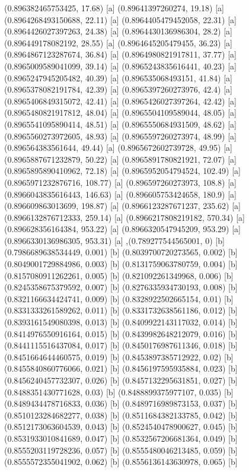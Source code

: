 {{{(0.896382465753425, 17.68) [a] 
(0.89641397260274, 19.18) [a] 
(0.8964268493150688, 22.11) [a] 
(0.8964405479452058, 22.31) [a] 
(0.8964426027397263, 24.38) [a] 
(0.8964430136986304, 28.2) [a] 
(0.896449178082192, 28.55) [a] 
(0.8964645205479455, 36.23) [a] 
(0.8964867123287674, 36.84) [a] 
(0.8964980821917811, 37.77) [a] 
(0.8965009589041099, 39.14) [a] 
(0.8965243835616441, 40.23) [a] 
(0.8965247945205482, 40.39) [a] 
(0.896535068493151, 41.84) [a] 
(0.8965378082191784, 42.39) [a] 
(0.8965397260273976, 42.4) [a] 
(0.8965406849315072, 42.41) [a] 
(0.8965426027397264, 42.42) [a] 
(0.8965480821917812, 48.04) [a] 
(0.8965504109589044, 48.05) [a] 
(0.8965541095890414, 48.51) [a] 
(0.8965550684931509, 48.62) [a] 
(0.8965560273972605, 48.93) [a] 
(0.8965597260273974, 48.99) [a] 
(0.896564383561644, 49.44) [a] 
(0.8965672602739728, 49.95) [a] 
(0.8965887671232879, 50.22) [a] 
(0.8965891780821921, 72.07) [a] 
(0.8965895890410962, 72.18) [a] 
(0.8965952054794524, 102.49) [a] 
(0.8965971232876716, 108.77) [a] 
(0.896597260273973, 108.8) [a] 
(0.8966043835616443, 146.63) [a] 
(0.896605753424658, 180.9) [a] 
(0.896609863013699, 198.87) [a] 
(0.8966123287671237, 235.62) [a] 
(0.8966132876712333, 259.14) [a] 
(0.8966217808219182, 570.34) [a] 
(0.896628356164384, 953.22) [a] 
(0.8966320547945209, 953.29) [a] 
(0.8966330136986305, 953.31) [a] 
},{(0.789277544565001, 0) [b] 
(0.7986689638534449, 0.001) [b] 
(0.8039700720273565, 0.002) [b] 
(0.8049001729884986, 0.003) [b] 
(0.8131759063780759, 0.004) [b] 
(0.8157080911262261, 0.005) [b] 
(0.821092261349968, 0.006) [b] 
(0.8245358675379592, 0.007) [b] 
(0.8276335934730193, 0.008) [b] 
(0.8321166634424741, 0.009) [b] 
(0.8328922502665154, 0.01) [b] 
(0.8331333261589262, 0.011) [b] 
(0.8331732638561186, 0.012) [b] 
(0.8393161549080398, 0.013) [b] 
(0.8409922143117032, 0.014) [b] 
(0.8414976550916164, 0.015) [b] 
(0.8439982648212079, 0.016) [b] 
(0.8441115516437084, 0.017) [b] 
(0.8450176987611346, 0.018) [b] 
(0.8451664644460575, 0.019) [b] 
(0.8453897385712922, 0.02) [b] 
(0.8455840860776066, 0.021) [b] 
(0.8456197595935884, 0.023) [b] 
(0.8456240457732307, 0.026) [b] 
(0.8457132295631851, 0.027) [b] 
(0.8488351430771628, 0.03) [b] 
(0.8488899375977107, 0.035) [b] 
(0.8489434478716833, 0.036) [b] 
(0.8489716989873153, 0.037) [b] 
(0.8510123284682277, 0.038) [b] 
(0.8511684382133785, 0.042) [b] 
(0.8512173063604539, 0.043) [b] 
(0.8524540478900627, 0.045) [b] 
(0.8531933010841689, 0.047) [b] 
(0.8532567206681364, 0.049) [b] 
(0.8555203119728236, 0.057) [b] 
(0.8555480046213485, 0.059) [b] 
(0.8555572355041902, 0.062) [b] 
(0.8556136143630978, 0.065) [b] 
}}}
